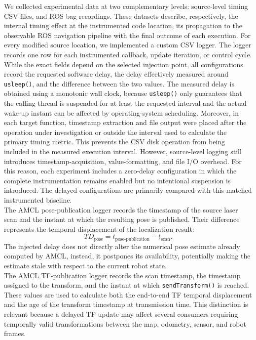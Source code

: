 \noindent We collected experimental data at two complementary levels: source-level timing CSV files, and ROS bag recordings. These datasets describe, respectively, the internal timing effect at the instrumented code location, its propagation to the observable ROS navigation pipeline with the final outcome of each execution.
For every modified source location, we implemented a custom CSV logger. The logger records one row for each instrumented callback, update iteration, or control cycle. While the exact fields depend on the selected injection point, all configurations record the requested software delay, the delay effectively measured around \texttt{usleep()}, and the difference between the two values. The measured delay is obtained using a monotonic wall clock, because \texttt{usleep()} only guarantees that the calling thread is suspended for at least the requested interval and the actual wake-up instant can be affected by operating-system scheduling.
Moreover, in each target function, timestamp extraction and file output were placed after the operation under investigation or outside the interval used to calculate the primary timing metric. This prevents the CSV disk operation from being included in the measured execution interval. However, source-level logging still introduces timestamp-acquisition, value-formatting, and file I/O overhead. For this reason, each experiment includes a zero-delay configuration in which the complete instrumentation remains enabled but no intentional suspension is introduced. The delayed configurations are primarily compared with this matched instrumented baseline.
\\
The AMCL pose-publication logger records the timestamp of the source laser scan and the instant at which the resulting pose is published. Their difference represents the temporal displacement of the localization result: 
\begin{equation}
TD_{\text{pose}} = t_{\text{pose-publication}} - t_{\text{scan}}.
\end{equation}
The injected delay does not directly alter the numerical pose estimate already computed by AMCL, instead, it postpones its availability, potentially making the estimate stale with respect to the current robot state.
\\
The AMCL TF-publication logger records the scan timestamp, the timestamp assigned to the transform, and the instant at which \texttt{sendTransform()} is reached. These values are used to calculate both the end-to-end TF temporal displacement and the age of the transform timestamp at transmission time. This distinction is relevant because a delayed TF update may affect several consumers requiring temporally valid transformations between the map, odometry, sensor, and robot frames.


